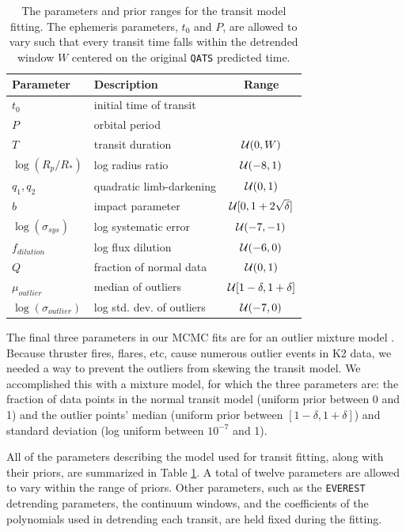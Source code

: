 \documentclass[twocolumn]{aastex62}
\newcommand{\pipeline}[1]{\texttt{#1}}
\begin{document}
\renewcommand{\arraystretch}{1.2}
\begin{table}[tbp]
\caption{The parameters and prior ranges for the transit model
  fitting. The ephemeris parameters, $t_0$ and $P$, are allowed to
  vary such that every transit time falls within the detrended window
  $W$ centered on the original \pipeline{QATS} predicted time.
\label{tab:params}}
\centering
\begin{tabular}{|llc|}
\hline
Parameter & Description & Range \\
\hline
$t_0$ & initial time of transit & \\ 
$P$   & orbital period &  \\ 
$T$   & transit duration & ${\cal U}(0,W)$\\
$\log(R_p/R_*)$ & log radius ratio & ${\cal U}(-8,1)$\\ 
$q_1,q_2$ & quadratic limb-darkening & ${\cal U}(0,1)$\\
$b$ & impact parameter & ${\cal U}[0,1+2\sqrt{\delta}]$\\
$\log(\sigma_{sys})$ & log systematic error & ${\cal U}(-7,-1)$\\
$f_{dilution}$ & log flux dilution & ${\cal U}(-6,0)$\\
$Q$ & fraction of normal data & ${\cal U}(0,1)$\\
$\mu_{outlier}$ & median of outliers & ${\cal U}[1-\delta,1+\delta]$\\
$\log(\sigma_{outlier})$ & log std. dev. of outliers &$ {\cal U}(-7,0)$\\
\hline
\end{tabular}
\end{table}
\renewcommand{\arraystretch}{1.}

The final three parameters in our MCMC fits are for an outlier mixture
model \citep{for14b}. Because thruster fires, flares, etc, cause
numerous outlier events in K2 data, we needed a way to prevent the
outliers from skewing the transit model. We accomplished this with a
mixture model, for which the three parameters are: the fraction of
data points in the normal transit model (uniform prior between 0 and
1) and the outlier points' median (uniform prior between $[1 - \delta,
  1 + \delta]$) and standard deviation (log uniform between $10^{-7}$
and 1).

All of the parameters describing the model used for transit fitting,
along with their priors, are summarized in Table \ref{tab:params}.  A
total of twelve parameters are allowed to vary within the range of
priors.  Other parameters, such as the \pipeline{EVEREST} detrending
parameters, the continuum windows, and the coefficients of the
polynomials used in detrending each transit, are held fixed during the
fitting.
\end{document}
